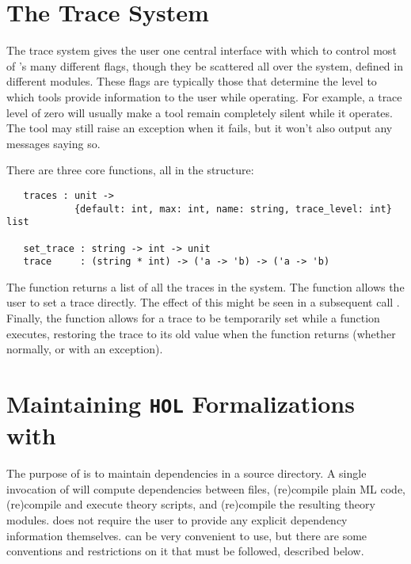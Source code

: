 \section{The Trace System}
\label{sec:traces}

The trace system gives the user one central interface with which to control most of \HOL's many different flags, though they be scattered all over the system, defined in different modules.
These flags are typically those that determine the level to which \HOL{} tools provide information to the user while operating.
For example, a trace level of zero will usually make a tool remain completely
silent while it operates.
The tool may still raise an exception when it fails, but it won't also
output any messages saying so.

There are three core functions, all in the  structure:
\begin{hol}
\begin{verbatim}
   traces : unit ->
            {default: int, max: int, name: string, trace_level: int} list

   set_trace : string -> int -> unit
   trace     : (string * int) -> ('a -> 'b) -> ('a -> 'b)
\end{verbatim}
\end{hol}

The  function returns a list of all the traces in the system.
The  function allows the user to set a trace directly.
The effect of this might be seen in a subsequent call .
Finally, the  function allows for a trace to be temporarily set while a function executes, restoring the trace to its old value when the function returns (whether normally, or with an exception).



\section{Maintaining \texttt{HOL} Formalizations with \holmake}
\label{Holmake}

The purpose of \holmake{} is to maintain dependencies in a \HOL{}
source directory. A single invocation of \holmake{} will compute
dependencies between files, (re)compile plain ML code, (re)compile and
execute theory scripts, and (re)compile the resulting theory modules.
\holmake{} does not require the user to provide any explicit
dependency information themselves. \holmake{} can be very convenient
to use, but there are some conventions and restrictions on it that
must be followed, described below.




